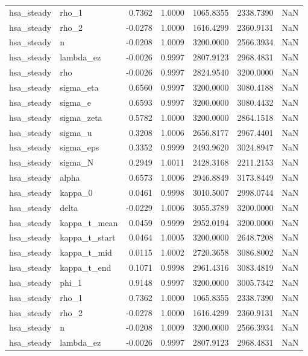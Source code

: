 \begin{tabular}{llrrrrl}
hsa\_steady & rho\_1 & 0.7362 & 1.0000 & 1065.8355 & 2338.7390 & NaN \\
hsa\_steady & rho\_2 & -0.0278 & 1.0000 & 1616.4299 & 2360.9131 & NaN \\
hsa\_steady & n & -0.0208 & 1.0009 & 3200.0000 & 2566.3934 & NaN \\
hsa\_steady & lambda\_ez & -0.0026 & 0.9997 & 2807.9123 & 2968.4831 & NaN \\
hsa\_steady & rho & -0.0026 & 0.9997 & 2824.9540 & 3200.0000 & NaN \\
hsa\_steady & sigma\_eta & 0.6560 & 0.9997 & 3200.0000 & 3080.4188 & NaN \\
hsa\_steady & sigma\_e & 0.6593 & 0.9997 & 3200.0000 & 3080.4432 & NaN \\
hsa\_steady & sigma\_zeta & 0.5782 & 1.0000 & 3200.0000 & 2864.1518 & NaN \\
hsa\_steady & sigma\_u & 0.3208 & 1.0006 & 2656.8177 & 2967.4401 & NaN \\
hsa\_steady & sigma\_eps & 0.3352 & 0.9999 & 2493.9620 & 3024.8947 & NaN \\
hsa\_steady & sigma\_N & 0.2949 & 1.0011 & 2428.3168 & 2211.2153 & NaN \\
hsa\_steady & alpha & 0.6573 & 1.0006 & 2946.8849 & 3173.8449 & NaN \\
hsa\_steady & kappa\_0 & 0.0461 & 0.9998 & 3010.5007 & 2998.0744 & NaN \\
hsa\_steady & delta & -0.0229 & 1.0006 & 3055.3789 & 3200.0000 & NaN \\
hsa\_steady & kappa\_t\_mean & 0.0459 & 0.9999 & 2952.0194 & 3200.0000 & NaN \\
hsa\_steady & kappa\_t\_start & 0.0464 & 1.0005 & 3200.0000 & 2648.7208 & NaN \\
hsa\_steady & kappa\_t\_mid & 0.0115 & 1.0002 & 2720.3658 & 3086.8002 & NaN \\
hsa\_steady & kappa\_t\_end & 0.1071 & 0.9998 & 2961.4316 & 3083.4819 & NaN \\
hsa\_steady & phi\_1 & 0.9148 & 0.9997 & 3200.0000 & 3005.7342 & NaN \\
hsa\_steady & rho\_1 & 0.7362 & 1.0000 & 1065.8355 & 2338.7390 & NaN \\
hsa\_steady & rho\_2 & -0.0278 & 1.0000 & 1616.4299 & 2360.9131 & NaN \\
hsa\_steady & n & -0.0208 & 1.0009 & 3200.0000 & 2566.3934 & NaN \\
hsa\_steady & lambda\_ez & -0.0026 & 0.9997 & 2807.9123 & 2968.4831 & NaN \\

\end{tabular}
